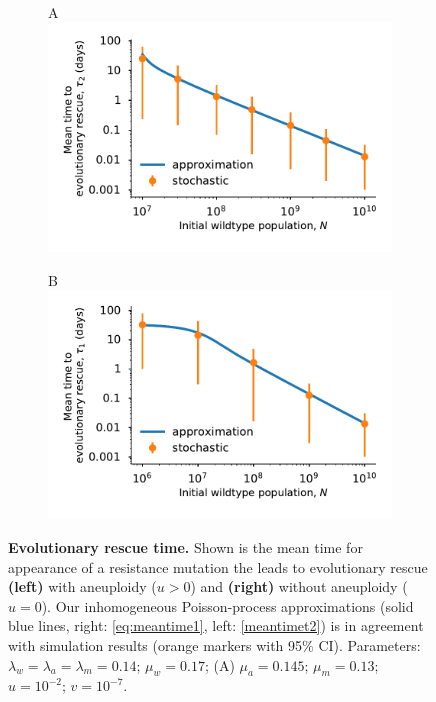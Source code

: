 \documentclass[12pt]{extarticle}
\begin{document}
\begin{appendices}
\begin{figure}[!htb]
\begin{subfigure}{0.5\textwidth}
A\\
\includegraphics[width=1\textwidth]{Figures/MeanTimeDeleteriousPlot.pdf}
\end{subfigure}
\begin{subfigure}{0.5\textwidth}
B\\
\includegraphics[width=1\textwidth]{Figures/MeanTimeGrowthMutantDirectPlot.pdf}
\end{subfigure}
\caption{\textbf{Evolutionary rescue time.}
Shown is the mean time for appearance of a resistance mutation the leads to evolutionary rescue \textbf{(left)} with aneuploidy ($u>0$) and \textbf{(right)} without aneuploidy ($u=0$).
Our inhomogeneous Poisson-process approximations (solid blue lines, right: \cref{eq:meantime1}, left: \cref{meantimet2}) is in agreement with simulation results (orange markers with 95\% CI). 
Parameters: $\lambda_w=\lambda_a=\lambda_m=0.14$; $\mu_w=0.17$; (A) $\mu_a=0.145$; $\mu_m=0.13$; $u=10^{-2}$; $v=10^{-7}$.
}
\label{MeanTimeGrowthAneuploidyPlot} 
\end{figure}


\end{appendices}
\end{document}
